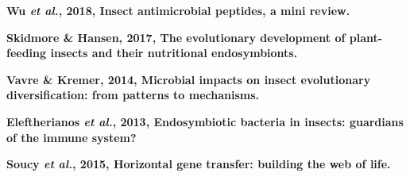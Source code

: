 \documentclass[11pt]{article}
\begin{document}
\begin{sloppypar}
\par
\textbf{Wu \textit{et al.}, 2018, Insect antimicrobial peptides, a mini review.} \newline
\par
\textbf{Skidmore & Hansen, 2017, The evolutionary development of plant-feeding insects and their nutritional endosymbionts.} \newline
\par
\textbf{Vavre & Kremer, 2014, Microbial impacts on insect evolutionary diversification: from patterns to mechanisms.} \newline
\par
\textbf{Eleftherianos \textit{et al.}, 2013, Endosymbiotic bacteria in insects: guardians of the immune system?}
\par
\textbf{Soucy \textit{et al.}, 2015, Horizontal gene transfer: building the web of life.}
\par


\end{sloppypar}
\end{document}
